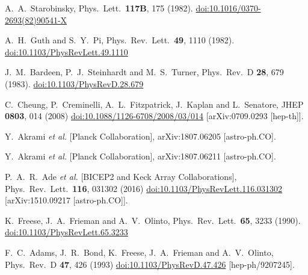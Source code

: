 \documentclass[12pt]{article}
\begin{document}
\begin{thebibliography}{99}
  A.~A.~Starobinsky,
  Phys.\ Lett.\  {\bf 117B}, 175 (1982).
  \href{https://dx.doi.org/10.1016/0370-2693(82)90541-X}{doi:10.1016/0370-2693(82)90541-X}

  A.~H.~Guth and S.~Y.~Pi,
  Phys.\ Rev.\ Lett.\  {\bf 49}, 1110 (1982).
  \href{https://dx.doi.org/10.1103/PhysRevLett.49.1110}{doi:10.1103/PhysRevLett.49.1110}

  J.~M.~Bardeen, P.~J.~Steinhardt and M.~S.~Turner,
  Phys.\ Rev.\ D {\bf 28}, 679 (1983).
  \href{https://dx.doi.org/10.1103/PhysRevD.28.679}{doi:10.1103/PhysRevD.28.679}

  C.~Cheung, P.~Creminelli, A.~L.~Fitzpatrick, J.~Kaplan and L.~Senatore,
  JHEP {\bf 0803}, 014 (2008)
  \href{https://dx.doi.org/10.1088/1126-6708/2008/03/014}{doi:10.1088/1126-6708/2008/03/014}
  [arXiv:0709.0293 [hep-th]].

  Y.~Akrami {\it et al.} [Planck Collaboration],
  arXiv:1807.06205 [astro-ph.CO].

  Y.~Akrami {\it et al.} [Planck Collaboration],
  arXiv:1807.06211 [astro-ph.CO].

  P.~A.~R.~Ade {\it et al.} [BICEP2 and Keck Array Collaborations],
  Phys.\ Rev.\ Lett.\  {\bf 116}, 031302 (2016)
  \href{https://dx.doi.org/10.1103/PhysRevLett.116.031302}{doi:10.1103/PhysRevLett.116.031302}
  [arXiv:1510.09217 [astro-ph.CO]].

  K.~Freese, J.~A.~Frieman and A.~V.~Olinto,
  Phys.\ Rev.\ Lett.\  {\bf 65}, 3233 (1990).
  \href{https://dx.doi.org/10.1103/PhysRevLett.65.3233}{doi:10.1103/PhysRevLett.65.3233}

  F.~C.~Adams, J.~R.~Bond, K.~Freese, J.~A.~Frieman and A.~V.~Olinto,
  Phys.\ Rev.\ D {\bf 47}, 426 (1993)
  \href{https://dx.doi.org/10.1103/PhysRevD.47.426}{doi:10.1103/PhysRevD.47.426}
  [hep-ph/9207245].


\end{thebibliography}
\end{document}
